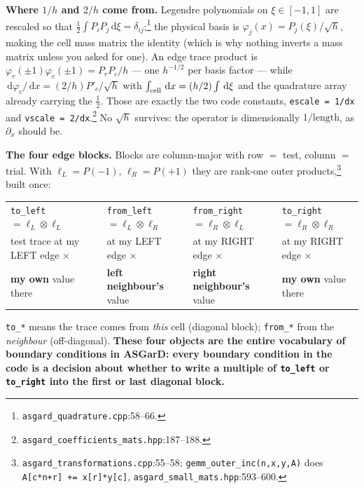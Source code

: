\documentclass[10pt]{article}
\newcommand{\code}[1]{\texttt{#1}}
\newcommand{\dd}{\,\mathrm{d}}
\newcommand{\fl}[2]{\texttt{#1}:#2}
\begin{document}
\textbf{Where $1/h$ and $2/h$ come from.} Legendre polynomials on $\xi\in[-1,1]$
are rescaled so that $\tfrac12\int P_iP_j\dd\xi=\delta_{ij}$;\footnote{\fl{asgard\_quadrature.cpp}{58--66}.}
the physical basis is $\varphi_j(x)=P_j(\xi)/\sqrt h$, making the cell mass matrix
the identity (which is why nothing inverts a mass matrix unless you asked for
one). An edge trace product is $\varphi_r(\pm1)\varphi_c(\pm1)=P_rP_c/h$ --- one
$h^{-1/2}$ per basis factor --- while $\dd\varphi_c/\dd x=(2/h)P'_c/\sqrt h$ with
$\int_{\rm cell}\dd x=(h/2)\int\dd\xi$ and the quadrature array already carrying
the $\tfrac12$. Those are exactly the two code constants,
\code{escale = 1/dx} and \code{vscale = 2/dx}.\footnote{\fl{asgard\_coefficients\_mats.hpp}{187--188}.}
No $\sqrt h$ survives: the operator is dimensionally $1/\text{length}$, as
$\partial_x$ should be.

\textbf{The four edge blocks.} Blocks are column-major with row $=$ test, column
$=$ trial. With $\ell_L=P(-1)$, $\ell_R=P(+1)$ they are rank-one outer
products,\footnote{\fl{asgard\_transformations.cpp}{55--58};
\code{gemm\_outer\_inc(n,x,y,A)} does \code{A[c*n+r] += x[r]*y[c]},
\fl{asgard\_small\_mats.hpp}{593--600}.} built once:
\begin{center}\small
\begin{tabular}{@{}llll@{}}
\toprule
\code{to\_left}$=\ell_L\!\otimes\!\ell_L$ & \code{from\_left}$=\ell_L\!\otimes\!\ell_R$ & \code{from\_right}$=\ell_R\!\otimes\!\ell_L$ & \code{to\_right}$=\ell_R\!\otimes\!\ell_R$\\
test trace at my LEFT edge $\times$ & at my LEFT edge $\times$ & at my RIGHT edge $\times$ & at my RIGHT edge $\times$ \\
\textbf{my own} value there & \textbf{left neighbour's} value & \textbf{right neighbour's} value & \textbf{my own} value there \\
\bottomrule
\end{tabular}
\end{center}
\code{to\_*} means the trace comes from \emph{this} cell (diagonal block);
\code{from\_*} from the \emph{neighbour} (off-diagonal). \textbf{These four
objects are the entire vocabulary of boundary conditions in ASGarD: every
boundary condition in the code is a decision about whether to write a multiple of
\code{to\_left} or \code{to\_right} into the first or last diagonal block.}
\end{document}
